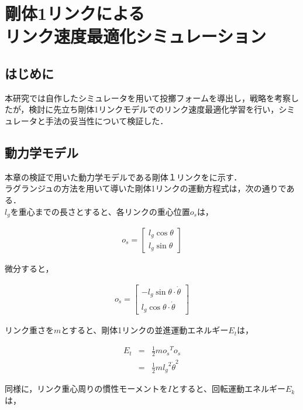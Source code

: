 \chapter[剛体1リンクによるリンク速度最適化シミュレーション]{剛体1リンクによる\\リンク速度最適化シミュレーション}

\section{はじめに}
本研究では自作したシミュレータを用いて投擲フォームを導出し，戦略を考察したが，検討に先立ち剛体1リンクモデルでのリンク速度最適化学習を行い，シミュレータと手法の妥当性について検証した．
\section{動力学モデル}
本章の検証で用いた動力学モデルである剛体１リンクをに示す．\\
ラグランジュの方法\cite{lagrange}を用いて導いた剛体1リンクの運動方程式は，次の通りである．\\
$l_{g}$を重心までの長さとすると、各リンクの重心位置$o_{s}$は，

\begin{eqnarray}
  o_{s} = 
              \begin{bmatrix}
              l_{g}\cos\theta\\
              l_{g}\sin\theta
              \end{bmatrix}
\end{eqnarray}

微分すると，

\begin{eqnarray}
  o_{\dot{s}} = 
              \begin{bmatrix}
              -l_{g}\sin\theta \cdot \dot{\theta}\\
              l_{g}\cos\theta \cdot \dot{\theta}
              \end{bmatrix}
\end{eqnarray}

リンク重さを$m$とすると、剛体1リンクの並進運動エネルギー$E_{t}$は，

\begin{eqnarray}
  E_{t} 
  &=&\frac{1}{2}mo_{\dot{s}}{}^T\!o_{\dot{s}} \nonumber \\
  &=&\frac{1}{2}m{l_{g}}^2{\dot{\theta}}^2
\end{eqnarray}

同様に，リンク重心周りの慣性モーメントを$I$とすると、回転運動エネルギー$E_{k}$は，

